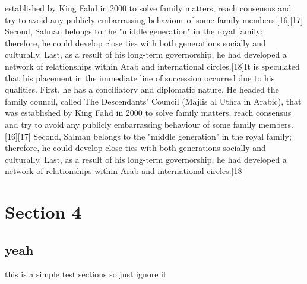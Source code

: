 \documentclass[12pt]{article}
\begin{document}
 established by King Fahd in 2000 to solve family matters, reach consensus and try to avoid any publicly embarrassing behaviour of some family members.[16][17] Second, Salman belongs to the "middle generation" in the royal family; \\therefore, he could develop close ties with both generations socially and culturally. Last, as a result of his long-term governorship, he had developed a network of relationships within Arab and international circles.[18]It is speculated that his placement in the immediate line of succession occurred due to his qualities. First, he has a conciliatory and diplomatic nature. He headed the family council, called The Descendants' Council (Majlis al Uthra in Arabic), that was established by King Fahd in 2000 to solve family matters, reach consensus and try to avoid any publicly embarrassing behaviour of some family members.[16][17] Second, Salman belongs to the "middle generation" in the royal family; therefore, he could develop close ties with both generations socially and culturally. Last, as a result of his long-term governorship, he had developed a network of relationships within Arab and international circles.[18]
 
\section{Section 4}
\subsection{yeah}
this is a simple test sections so just ignore it 
 
 
\end{document}
